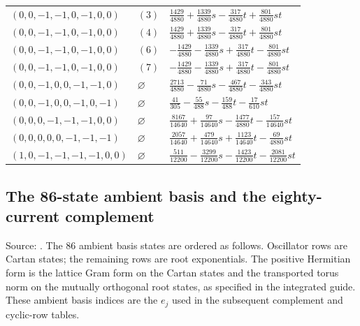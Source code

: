 \begin{longtable}{@{}lll@{}}
$(0,0,-1,-1,0,-1,0,0)$ & $(3)$ & $\frac{1429}{4880}+\allowbreak \frac{1339}{4880}s-\frac{317}{4880}t+\allowbreak \frac{801}{4880}st$\\
$(0,0,-1,-1,0,-1,0,0)$ & $(4)$ & $\frac{1429}{4880}+\allowbreak \frac{1339}{4880}s-\frac{317}{4880}t+\allowbreak \frac{801}{4880}st$\\
$(0,0,-1,-1,0,-1,0,0)$ & $(6)$ & $-\frac{1429}{4880}-\frac{1339}{4880}s+\allowbreak \frac{317}{4880}t-\frac{801}{4880}st$\\
$(0,0,-1,-1,0,-1,0,0)$ & $(7)$ & $-\frac{1429}{4880}-\frac{1339}{4880}s+\allowbreak \frac{317}{4880}t-\frac{801}{4880}st$\\
$(0,0,-1,0,0,-1,-1,0)$ & $\varnothing$ & $\frac{2713}{4880}-\frac{71}{4880}s-\frac{467}{4880}t-\frac{343}{4880}st$\\
$(0,0,-1,0,0,-1,0,-1)$ & $\varnothing$ & $\frac{41}{305}-\frac{55}{488}s-\frac{159}{488}t-\frac{17}{610}st$\\
$(0,0,0,-1,-1,-1,0,0)$ & $\varnothing$ & $\frac{8167}{14640}+\allowbreak \frac{97}{14640}s-\frac{1477}{4880}t-\frac{157}{14640}st$\\
$(0,0,0,0,0,-1,-1,-1)$ & $\varnothing$ & $\frac{2057}{14640}+\allowbreak \frac{479}{14640}s+\allowbreak \frac{1123}{14640}t-\frac{69}{4880}st$\\
$(1,0,-1,-1,-1,-1,0,0)$ & $\varnothing$ & $\frac{511}{12200}-\frac{3299}{12200}s-\frac{1423}{12200}t-\frac{2081}{12200}st$\\
\end{longtable}
\endgroup
\subsection{The 86-state ambient basis and the eighty-current complement}
\label{expdata:80-top}
Source: .
The 86 ambient basis states are ordered as follows. Oscillator rows are
Cartan states; the remaining rows are root exponentials. The positive
Hermitian form is the lattice Gram form on the Cartan states and the
transported torus norm on the mutually orthogonal root states, as specified
in the integrated guide. These ambient basis indices are the $e_j$ used
in the subsequent complement and cyclic-row tables.


